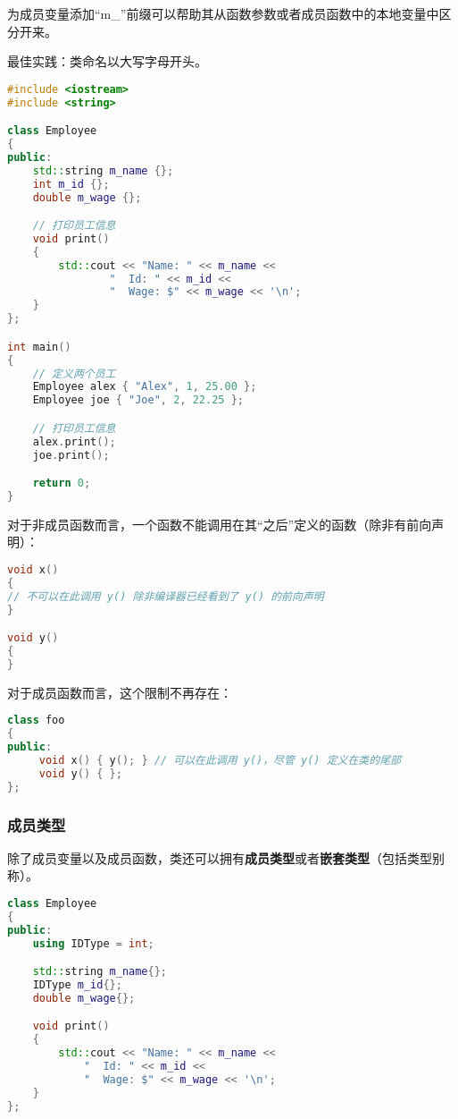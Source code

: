 \documentclass[../../LearnCpp.tex]{subfiles}
\begin{document}
为成员变量添加“m\_”前缀可以帮助其从函数参数或者成员函数中的本地变量中区分开来。

最佳实践：类命名以大写字母开头。

\begin{lstlisting}[language=C++]
#include <iostream>
#include <string>

class Employee
{
public:
    std::string m_name {};
    int m_id {};
    double m_wage {};

    // 打印员工信息
    void print()
    {
        std::cout << "Name: " << m_name <<
                "  Id: " << m_id <<
                "  Wage: $" << m_wage << '\n';
    }
};

int main()
{
    // 定义两个员工
    Employee alex { "Alex", 1, 25.00 };
    Employee joe { "Joe", 2, 22.25 };

    // 打印员工信息
    alex.print();
    joe.print();

    return 0;
}
\end{lstlisting}

对于非成员函数而言，一个函数不能调用在其“之后”定义的函数（除非有前向声明）：

\begin{lstlisting}[language=C++]
void x()
{
// 不可以在此调用 y() 除非编译器已经看到了 y() 的前向声明
}

void y()
{
}
\end{lstlisting}

对于成员函数而言，这个限制不再存在：

\begin{lstlisting}[language=C++]
class foo
{
public:
     void x() { y(); } // 可以在此调用 y()，尽管 y() 定义在类的尾部
     void y() { };
};
\end{lstlisting}

\subsubsection*{成员类型}

除了成员变量以及成员函数，类还可以拥有\textbf{成员类型}或者\textbf{嵌套类型}（包括类型别称）。

\begin{lstlisting}[language=C++]
class Employee
{
public:
    using IDType = int;

    std::string m_name{};
    IDType m_id{};
    double m_wage{};

    void print()
    {
        std::cout << "Name: " << m_name <<
            "  Id: " << m_id <<
            "  Wage: $" << m_wage << '\n';
    }
};
\end{lstlisting}
\end{document}
